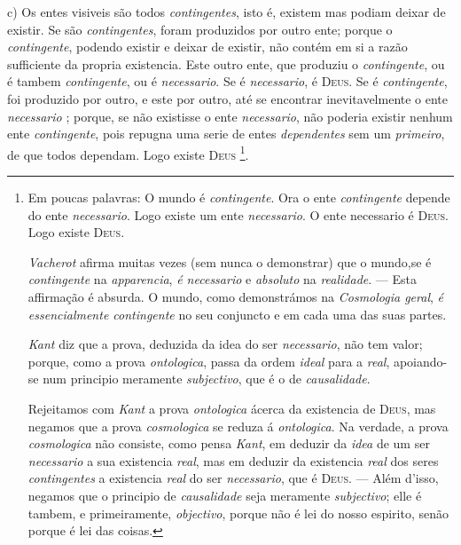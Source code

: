 c) Os entes visiveis são todos \emph{contingentes}, isto é, existem mas podiam deixar de existir. Se são \emph{contingentes}, foram produzidos por outro ente; porque o \emph{contingente}, podendo existir e deixar de existir, não contém em si a razão sufficiente da propria existencia. Este outro ente, que produziu o \emph{contingente}, ou é tambem \emph{contingente}, ou é \emph{necessario}. Se é \emph{necessario}, é \textsc{Deus}. Se é \emph{contingente}, foi produzido por outro, e este por outro, até se encontrar inevitavelmente o ente \emph{necessario} ; porque, se não existisse o ente \emph{necessario}, não poderia existir nenhum ente \emph{contingente}, pois repugna uma serie de entes \emph{dependentes} sem um \emph{primeiro}, de que todos dependam. Logo existe \textsc{Deus} \footnote{Em poucas palavras: O mundo é \emph{contingente}. Ora o ente \emph{contingente} depende do ente \emph{necessario}. Logo existe um ente \emph{necessario}. O ente necessario é \textsc{Deus}. Logo existe \textsc{Deus}.\par \emph{Vacherot} afirma muitas vezes (sem nunca o demonstrar) que o mundo,se é \emph{contingente} na \emph{apparencia}, \emph{é necessario} e \emph{absoluto} na \emph{realidade}. --- Esta affirmação é absurda. O mundo, como demonstrámos na \emph{Cosmologia geral}, \emph{é essencialmente contingente} no seu conjuncto e em cada uma das suas partes.\par \emph{Kant} diz que a prova, deduzida da idea do ser \emph{necessario}, não tem valor; porque, como a prova \emph{ontologica}, passa da ordem \emph{ideal} para a \emph{real}, apoiando-se num principio meramente \emph{subjectivo}, que é o de \emph{causalidade}.\par Rejeitamos com \emph{Kant} a prova \emph{ontologica} ácerca da existencia de \textsc{Deus}, mas negamos que a prova \emph{cosmologica} se reduza á \emph{ontologica}. Na verdade, a prova \emph{cosmologica} não consiste, como pensa \emph{Kant}, em deduzir da \emph{idea} de um ser \emph{necessario} a sua existencia \emph{real}, mas em deduzir da existencia \emph{real} dos seres \emph{contingentes} a existencia \emph{real} do ser \emph{necessario}, que é \textsc{Deus}. --- Além d'isso, negamos que o principio de \emph{causalidade} seja meramente \emph{subjectivo}; elle é tambem, e primeiramente, \emph{objectivo}, porque não é lei do nosso espirito, senão porque é lei das coisas.}.
